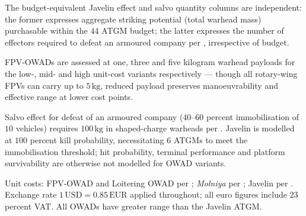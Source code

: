 \begin{landscape}
\begin{table}[ht]
\begin{minipage}{0.95\linewidth}
			The budget-equivalent Javelin effect and salvo quantity columns are independent: the former expresses aggregate striking potential (total warhead mass) purchasable within the $44$ ATGM budget; the latter expresses the number of effectors required to defeat an armoured company per \textcite[26--28]{BRONK_2024}, irrespective of budget. 
			
			FPV-OWADs are assessed at one, three and five kilogram warhead payloads for the low-, mid- and high unit-cost variants respectively --- though all rotary-wing FPVs can carry up to $5\,\text{kg}$, reduced payload preserves manoeuvrability and effective range at lower cost points. 
			
			Salvo effect for defeat of an armoured company ($40$--$60$ percent immobilisation of $10$ vehicles) requires $100\,\text{kg}$ in shaped-charge warheads per \textcite[26--28]{BRONK_2024}. Javelin is modelled at $100$ percent kill probability, necessitating $6$ ATGMs to meet the immobilisation threshold; hit probability, terminal performance and platform survivability are otherwise not modelled for OWAD variants. 
			
			Unit costs: FPV-OWAD and Loitering OWAD per \textcite{BRONK_2024}; \textit{Molniya} per \textcite{grobovy}; Javelin per \textcite{MISSILES}. Exchange rate $1\,\text{USD} = 0.85\,\text{EUR}$ applied throughout; all euro figures include $23$ percent VAT. All OWADs have greater range than the Javelin ATGM.
		\end{minipage}
			\caption[Anti-Armour procurement heuristic]{Comparative Anti-Armour Procurement Heuristic: ATGMs versus FPV-OWADs and Loitering-OWADs}\label{tab:atgm_fpv_comparison12}
	\end{table}
\end{landscape}


